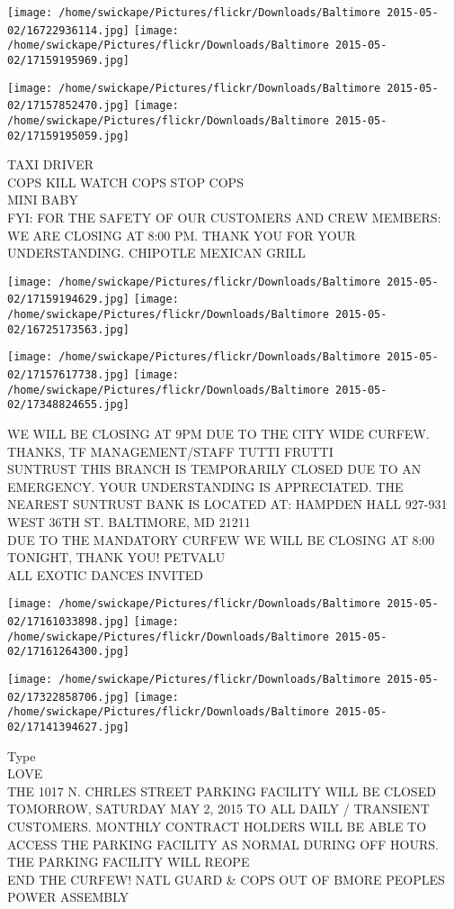 \documentclass[10pt,letterpaper]{article}
\begin{document}
\texttt{[image: /home/swickape/Pictures/flickr/Downloads/Baltimore 2015-05-02/16722936114.jpg]}
\texttt{[image: /home/swickape/Pictures/flickr/Downloads/Baltimore 2015-05-02/17159195969.jpg]}

\texttt{[image: /home/swickape/Pictures/flickr/Downloads/Baltimore 2015-05-02/17157852470.jpg]}
\texttt{[image: /home/swickape/Pictures/flickr/Downloads/Baltimore 2015-05-02/17159195059.jpg]}

TAXI DRIVER\\
COPS KILL WATCH COPS STOP COPS\\
MINI BABY\\
FYI: FOR THE SAFETY OF OUR CUSTOMERS AND CREW MEMBERS: WE ARE CLOSING AT 8:00 PM.  THANK YOU FOR YOUR UNDERSTANDING.  CHIPOTLE MEXICAN GRILL
\pagebreak

\texttt{[image: /home/swickape/Pictures/flickr/Downloads/Baltimore 2015-05-02/17159194629.jpg]}
\texttt{[image: /home/swickape/Pictures/flickr/Downloads/Baltimore 2015-05-02/16725173563.jpg]}

\texttt{[image: /home/swickape/Pictures/flickr/Downloads/Baltimore 2015-05-02/17157617738.jpg]}
\texttt{[image: /home/swickape/Pictures/flickr/Downloads/Baltimore 2015-05-02/17348824655.jpg]}

WE WILL BE CLOSING AT 9PM DUE TO THE CITY WIDE CURFEW.  THANKS, TF MANAGEMENT/STAFF  TUTTI FRUTTI\\
SUNTRUST THIS BRANCH IS TEMPORARILY CLOSED DUE TO AN EMERGENCY.  YOUR UNDERSTANDING IS APPRECIATED.  THE NEAREST SUNTRUST BANK IS LOCATED AT: HAMPDEN HALL 927{-}931 WEST 36TH ST. BALTIMORE, MD 21211\\
DUE TO THE MANDATORY CURFEW WE WILL BE CLOSING AT 8:00 TONIGHT, THANK YOU!  PETVALU\\
ALL EXOTIC DANCES INVITED
\pagebreak

\texttt{[image: /home/swickape/Pictures/flickr/Downloads/Baltimore 2015-05-02/17161033898.jpg]}
\texttt{[image: /home/swickape/Pictures/flickr/Downloads/Baltimore 2015-05-02/17161264300.jpg]}

\texttt{[image: /home/swickape/Pictures/flickr/Downloads/Baltimore 2015-05-02/17322858706.jpg]}
\texttt{[image: /home/swickape/Pictures/flickr/Downloads/Baltimore 2015-05-02/17141394627.jpg]}

Type\\
LOVE\\
THE 1017 N. CHRLES STREET PARKING FACILITY WILL BE CLOSED TOMORROW, SATURDAY MAY 2, 2015 TO ALL DAILY / TRANSIENT CUSTOMERS.  MONTHLY CONTRACT HOLDERS WILL BE ABLE TO ACCESS THE PARKING FACILITY AS NORMAL DURING OFF HOURS.  THE PARKING FACILITY WILL REOPE\\
END THE CURFEW!  NATL GUARD \& COPS OUT OF BMORE PEOPLES POWER ASSEMBLY
\pagebreak
\end{document}
